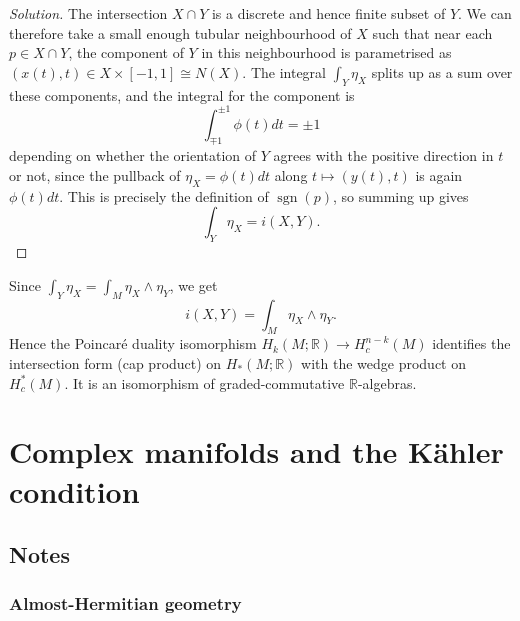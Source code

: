 \documentclass[a4paper]{article}
\theoremstyle{definition}
\theoremstyle{remark}
\DeclareMathOperator{\sgn}{sgn}
\newcommand{\R}{\mathbb{R}}
\begin{document}
\begin{proof}[Solution]
    The intersection $X\cap Y$ is a discrete and hence finite subset of $Y$.
    We can therefore take a small enough tubular neighbourhood of $X$ such that
    near each $p\in X\cap Y$, the component of $Y$ in this neighbourhood is parametrised as
    $(x(t),t)\in X\times[-1,1]\cong N(X)$. The integral $\int_Y\eta_X$ splits
    up as a sum over these components, and the integral for the component is
    \begin{equation*}
        \int_{\mp1}^{\pm1}\phi(t)dt = \pm1
    \end{equation*}
    depending on whether the orientation of $Y$ agrees with the positive
    direction in $t$ or not, since the pullback of $\eta_X=\phi(t)dt$ along
    $t\mapsto(y(t),t)$ is again $\phi(t)dt$. This is precisely the definition
    of $\sgn(p)$, so summing up gives
    \begin{equation*}
        \int_Y\eta_X = i(X,Y).
    \end{equation*}
\end{proof}

Since $\int_Y\eta_X=\int_M\eta_X\wedge\eta_Y$, we get
\begin{equation*}
    i(X,Y) = \int_M\eta_X\wedge\eta_Y.
\end{equation*}
Hence the Poincar\'e duality isomorphism $H_k(M;\R)\to H^{n-k}_c(M)$ identifies
the intersection form (cap product) on $H_*(M;\R)$ with the wedge product on
$H^*_c(M)$. It is an isomorphism of graded-commutative $\R$-algebras.

\section{Complex manifolds and the K\"ahler condition}

\subsection*{Notes}

\subsubsection*{Almost-Hermitian geometry}
\end{document}
